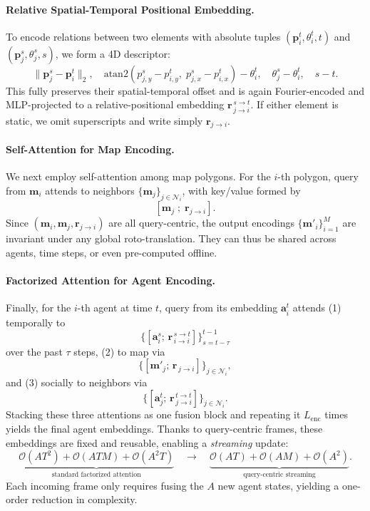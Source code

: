 \paragraph{Relative Spatial-Temporal Positional Embedding.}
To encode relations between two elements with absolute tuples $(\mathbf{p}_i^t,\theta_i^t,t)$ and $(\mathbf{p}_j^s,\theta_j^s,s)$, we form a 4D descriptor:
\[
\bigl\|\mathbf{p}_j^s - \mathbf{p}_i^t\bigr\|_2,\quad
\mathrm{atan2}(p_{j,y}^s - p_{i,y}^t,\;p_{j,x}^s - p_{i,x}^t) - \theta_i^t,\quad
\theta_j^s - \theta_i^t,\quad
s - t.
\]
This fully preserves their spatial-temporal offset and is again Fourier-encoded and MLP-projected to a relative-positional embedding $\mathbf{r}_{\,j\to i}^{\,s\to t}$.  If either element is static, we omit superscripts and write simply $\mathbf{r}_{j\to i}$.

\paragraph{Self-Attention for Map Encoding.}
We next employ self-attention among map polygons.  For the $i$-th polygon, query from $\mathbf{m}_i$ attends to neighbors $\{\mathbf{m}_j\}_{j\in\mathcal N_i}$, with key/value formed by
\[
[\mathbf{m}_j \;;\; \mathbf{r}_{j\to i}].
\]
Since $(\mathbf{m}_i,\mathbf{m}_j,\mathbf{r}_{j\to i})$ are all query-centric, the output encodings $\{\mathbf{m}'_i\}_{i=1}^M$ are invariant under any global roto-translation.  They can thus be shared across agents, time steps, or even pre-computed offline.

\paragraph{Factorized Attention for Agent Encoding.}
Finally, for the $i$-th agent at time $t$, query from its embedding $\mathbf{a}_i^t$ attends (1) temporally to
\[
\bigl\{[\mathbf{a}_i^s;\,\mathbf{r}_{\,i\to i}^{\,s\to t}]\bigr\}_{s=t-\tau}^{t-1}
\]
over the past $\tau$ steps, (2) to map via
\[
\bigl\{[\mathbf{m}'_j;\,\mathbf{r}_{\,j\to i}]\bigr\}_{j\in\mathcal N_i},
\]
and (3) socially to neighbors via
\[
\bigl\{[\mathbf{a}_j^t;\,\mathbf{r}_{\,j\to i}^{\,t\to t}]\bigr\}_{j\in\mathcal N_i}.
\]
Stacking these three attentions as one fusion block and repeating it $L_{\mathrm{enc}}$ times yields the final agent embeddings.  Thanks to query-centric frames, these embeddings are fixed and reusable, enabling a \emph{streaming} update:
\[
\underbrace{\mathcal{O}(AT^2)+\mathcal{O}(ATM)+\mathcal{O}(A^2T)}_{\text{standard factorized attention}}
\quad\longrightarrow\quad
\underbrace{\mathcal{O}(AT)+\mathcal{O}(AM)+\mathcal{O}(A^2)}_{\text{query-centric streaming}}.
\]
Each incoming frame only requires fusing the $A$ new agent states, yielding a one-order reduction in complexity.